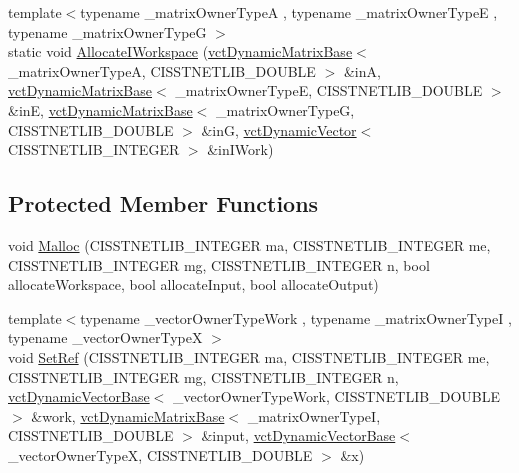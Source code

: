 \begin{DoxyCompactItemize}
\item 
{\footnotesize template$<$typename \+\_\+matrix\+Owner\+Type\+A , typename \+\_\+matrix\+Owner\+Type\+E , typename \+\_\+matrix\+Owner\+Type\+G $>$ }\\static void \hyperlink{classnmr_l_sq_lin_solution_dynamic_a2fbcdc13d936509207e989ad379a65cc}{Allocate\+I\+Workspace} (\hyperlink{classvct_dynamic_matrix_base}{vct\+Dynamic\+Matrix\+Base}$<$ \+\_\+matrix\+Owner\+Type\+A, C\+I\+S\+S\+T\+N\+E\+T\+L\+I\+B\+\_\+\+D\+O\+U\+B\+L\+E $>$ \&in\+A, \hyperlink{classvct_dynamic_matrix_base}{vct\+Dynamic\+Matrix\+Base}$<$ \+\_\+matrix\+Owner\+Type\+E, C\+I\+S\+S\+T\+N\+E\+T\+L\+I\+B\+\_\+\+D\+O\+U\+B\+L\+E $>$ \&in\+E, \hyperlink{classvct_dynamic_matrix_base}{vct\+Dynamic\+Matrix\+Base}$<$ \+\_\+matrix\+Owner\+Type\+G, C\+I\+S\+S\+T\+N\+E\+T\+L\+I\+B\+\_\+\+D\+O\+U\+B\+L\+E $>$ \&in\+G, \hyperlink{classvct_dynamic_vector}{vct\+Dynamic\+Vector}$<$ C\+I\+S\+S\+T\+N\+E\+T\+L\+I\+B\+\_\+\+I\+N\+T\+E\+G\+E\+R $>$ \&in\+I\+Work)
\end{DoxyCompactItemize}
\subsection*{Protected Member Functions}
\begin{DoxyCompactItemize}
\item 
void \hyperlink{classnmr_l_sq_lin_solution_dynamic_ab9622042003498de3ee330193b14e283}{Malloc} (C\+I\+S\+S\+T\+N\+E\+T\+L\+I\+B\+\_\+\+I\+N\+T\+E\+G\+E\+R ma, C\+I\+S\+S\+T\+N\+E\+T\+L\+I\+B\+\_\+\+I\+N\+T\+E\+G\+E\+R me, C\+I\+S\+S\+T\+N\+E\+T\+L\+I\+B\+\_\+\+I\+N\+T\+E\+G\+E\+R mg, C\+I\+S\+S\+T\+N\+E\+T\+L\+I\+B\+\_\+\+I\+N\+T\+E\+G\+E\+R n, bool allocate\+Workspace, bool allocate\+Input, bool allocate\+Output)
\item 
{\footnotesize template$<$typename \+\_\+vector\+Owner\+Type\+Work , typename \+\_\+matrix\+Owner\+Type\+I , typename \+\_\+vector\+Owner\+Type\+X $>$ }\\void \hyperlink{classnmr_l_sq_lin_solution_dynamic_a5bf0063ca540e3b2ff2410934d7e82dd}{Set\+Ref} (C\+I\+S\+S\+T\+N\+E\+T\+L\+I\+B\+\_\+\+I\+N\+T\+E\+G\+E\+R ma, C\+I\+S\+S\+T\+N\+E\+T\+L\+I\+B\+\_\+\+I\+N\+T\+E\+G\+E\+R me, C\+I\+S\+S\+T\+N\+E\+T\+L\+I\+B\+\_\+\+I\+N\+T\+E\+G\+E\+R mg, C\+I\+S\+S\+T\+N\+E\+T\+L\+I\+B\+\_\+\+I\+N\+T\+E\+G\+E\+R n, \hyperlink{classvct_dynamic_vector_base}{vct\+Dynamic\+Vector\+Base}$<$ \+\_\+vector\+Owner\+Type\+Work, C\+I\+S\+S\+T\+N\+E\+T\+L\+I\+B\+\_\+\+D\+O\+U\+B\+L\+E $>$ \&work, \hyperlink{classvct_dynamic_matrix_base}{vct\+Dynamic\+Matrix\+Base}$<$ \+\_\+matrix\+Owner\+Type\+I, C\+I\+S\+S\+T\+N\+E\+T\+L\+I\+B\+\_\+\+D\+O\+U\+B\+L\+E $>$ \&input, \hyperlink{classvct_dynamic_vector_base}{vct\+Dynamic\+Vector\+Base}$<$ \+\_\+vector\+Owner\+Type\+X, C\+I\+S\+S\+T\+N\+E\+T\+L\+I\+B\+\_\+\+D\+O\+U\+B\+L\+E $>$ \&x)
\end{DoxyCompactItemize}
